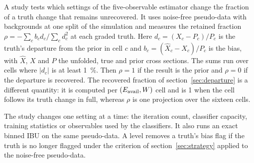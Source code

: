 A study tests which settings of the five-observable estimator change the fraction of a truth change that remains unrecovered. It uses noise-free pseudo-data with backgrounds at one split of the simulation and measures the retained fraction $\rho=-\sum_c b_c d_c/\sum_c d_c^2$ at each graded truth. Here $d_c=(X_c-P_c)/P_c$ is the truth's departure from the prior in cell $c$ and $b_c=(\hat X_c-X_c)/P_c$ is the bias, with $\hat X$, $X$ and $P$ the unfolded, true and prior cross sections. The sums run over cells where $|d_c|$ is at least \SI{1}{\percent}. Then $\rho=1$ if the result is the prior and $\rho=0$ if the departure is recovered. The recovered fraction of section~\ref{sec:departure} is a different quantity: it is computed per $(E_{\mathrm{avail}},W)$ cell and is 1 when the cell follows its truth change in full, whereas $\rho$ is one projection over the sixteen cells.

The study changes one setting at a time: the iteration count, classifier capacity, training statistics or observables used by the classifiers. It also runs an exact binned IBU on the same pseudo-data. A level removes a truth's bias flag if the truth is no longer flagged under the criterion of section~\ref{sec:strategy} applied to the noise-free pseudo-data.


